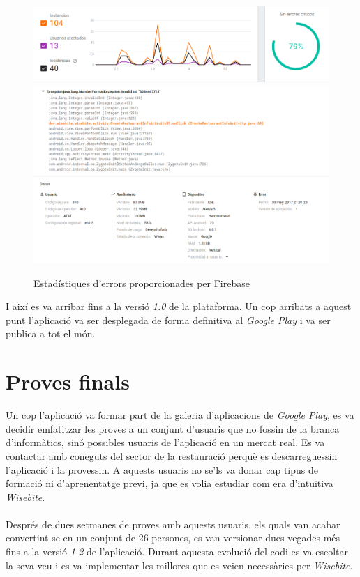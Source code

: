 \begin{figure}[H]
\includegraphics[scale=0.405]{Figures/crash_analytics.png}
\includegraphics[scale=0.385]{Figures/crash.png}
\caption{Estadístiques d'errors proporcionades per Firebase}
\end{figure}

\noindent I així es va arribar fins a la versió \textit{1.0} de la plataforma. Un cop arribats a aquest punt l'aplicació va ser desplegada de forma definitiva al \textit{Google Play} i va ser publica a tot el món.


\section{Proves finals}

Un cop l'aplicació va formar part de la galeria d'aplicacions de \textit{Google Play}, es va decidir emfatitzar les proves a un conjunt d'usuaris que no fossin de la branca d'informàtics, sinó possibles usuaris de l'aplicació en un mercat real. Es va contactar amb coneguts del sector de la restauració perquè es descarreguessin l'aplicació i la provessin. A aquests usuaris no se'ls va donar cap tipus de formació ni d'aprenentatge previ, ja que es volia estudiar com era d'intuïtiva \textit{Wisebite}.
\\\\
Després de dues setmanes de proves amb aquests usuaris, els quals van acabar convertint-se en un conjunt de 26 persones, es van versionar dues vegades més fins a la versió \textit{1.2} de l'aplicació. Durant aquesta evolució del codi es va escoltar la seva veu i es va implementar les millores que es veien necessàries per \textit{Wisebite}.